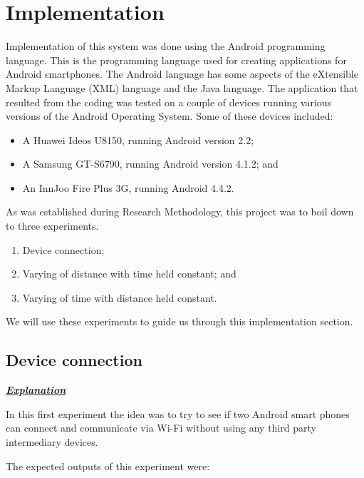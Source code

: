 \documentclass[12pt,svgnames,smaller]{article} %
\begin{document}

\section{\textbf{Implementation} } 

Implementation of this system was done using the Android programming language. This is the programming language used for creating applications for Android smartphones. The  Android language has some aspects of the eXtensible Markup Language (XML) language and the Java language. 
The application that resulted from the coding was tested on a couple of devices running various versions of the Android Operating System. Some of these devices included:

\begin{itemize}
	\item A Huawei Ideos U8150, running Android version 2.2;
	\item A Samsung GT-S6790, running Android version 4.1.2; and 
	\item An InnJoo Fire Plus 3G, running Android 4.4.2. 
\end{itemize}
As was established during Research Methodology, this project was to boil down to three experiments.

\begin{enumerate}
	\item Device connection;
	\item Varying of distance with time held constant; and 
	\item Varying of time with distance held constant.
\end{enumerate}

We will use these experiments to guide us through this implementation section.

\subsection{Device connection}

\textbf{\textit{\underline{Explanation}}}

In this first experiment the idea was to try to see if two Android smart phones can connect and communicate via Wi-Fi without using any third party intermediary devices.

The expected outputs of this experiment were:
\end{document}
